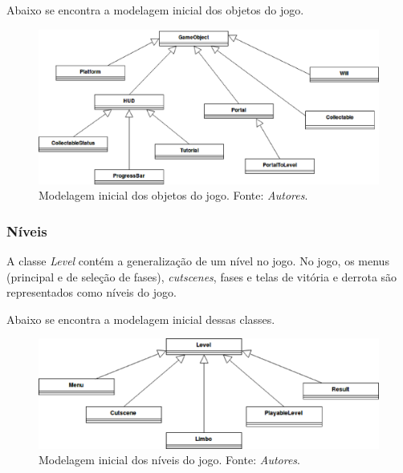       Abaixo se encontra a modelagem inicial dos objetos do jogo.

      \begin{figure}[H]
        \centering \includegraphics[keepaspectratio=true,scale=0.6]{figuras/class-diagram-1.eps}
        \caption[Modelagem inicial dos objetos do jogo]
          {Modelagem inicial dos objetos do jogo. Fonte: \textit{Autores}.}
        \label{game-object-children}
      \end{figure}

    \subsubsection{Níveis}

      A classe \textit{Level} contém a generalização de um nível no jogo. No jogo, os menus (principal e de seleção de fases), \textit{cutscenes}, fases e telas de vitória e derrota são representados como níveis do jogo.

      Abaixo se encontra a modelagem inicial dessas classes.

      \begin{figure}[H]
        \centering \includegraphics[keepaspectratio=true,scale=0.6]{figuras/class-diagram-2.eps}
        \caption[Modelagem inicial dos níveis do jogo]
          {Modelagem inicial dos níveis do jogo. Fonte: \textit{Autores}.}
        \label{game-object-levels}
      \end{figure}

